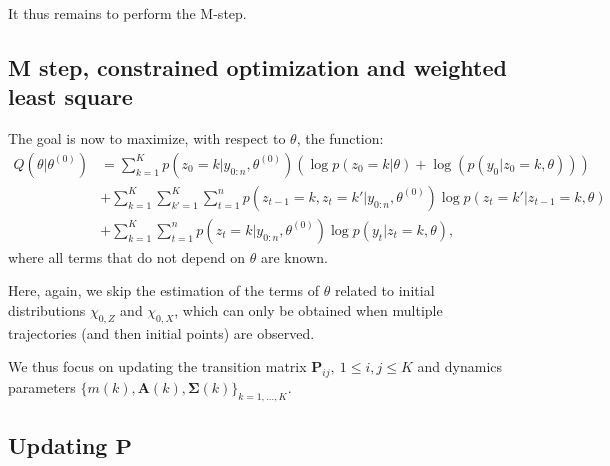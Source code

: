 \documentclass[
]{book}
\begin{document}
It thus remains to perform the M-step.

\hypertarget{m-step-constrained-optimization-and-weighted-least-square}{%
\subsection{M step, constrained optimization and weighted least square}\label{m-step-constrained-optimization-and-weighted-least-square}}

The goal is now to maximize, with respect to \(\theta\), the function:
\begin{align*}
Q(\theta \vert \theta^{(0)})&= \sum_{k = 1}^K p(z_0 = k \vert y_{0:n}, \theta^{(0)})\left(\log p(z_0 = k \vert \theta) + \log(p(y_0 \vert z_0 = k, \theta))\right)  \nonumber \\
& + \sum_{k = 1}^K\sum_{k' = 1}^K \sum_{t = 1}^n p(z_{t-1} = k, z_{t} = k'\vert y_{0:n}, \theta^{(0)}) \log p(z_{t} = k' \vert z_{t - 1} = k,\theta) \nonumber \\
& + \sum_{k = 1}^K \sum_{t = 1}^n p(z_t = k\vert y_{0:n}, \theta^{(0)}) \log p(y_{t} \vert z_{t} = k, \theta), \nonumber
\end{align*}
where all terms that do not depend on \(\theta\) are known.

Here, again, we skip the estimation of the terms of \(\theta\) related to initial distributions \(\chi_{0,Z}\) and \(\chi_{0, X}\), which can only be obtained when multiple trajectories (and then initial points) are observed.

We thus focus on updating the transition matrix \(\mathbf{P}_{ij},~1\leq i, j \leq K\) and dynamics parameters \(\lbrace m(k), \mathbf{A}(k), \mathbf{\Sigma}(k)\rbrace_{k = 1,\dots, K}\).

\hypertarget{updating-mathbfp}{%
\subsection*{\texorpdfstring{Updating \(\mathbf{P}\)}{Updating \textbackslash mathbf\{P\}}}\label{updating-mathbfp}}
\end{document}
